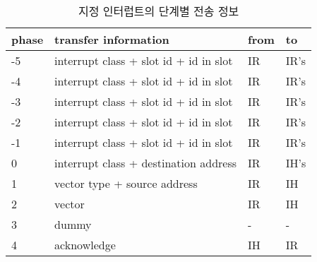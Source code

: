 %
%
\begin{table}[htbp]
\caption{지정 인터럽트의 단계별 전송 정보}\label{table:dir-int}
   \begin{center}
   \begin{tabular}{|l|l|l|l|} \hline
	phase & transfer information & from & to \\
\hline \hline
	-5 & interrupt class + slot id + id in slot & IR & IR's \\
	-4 & interrupt class + slot id + id in slot & IR & IR's \\
	-3 & interrupt class + slot id + id in slot & IR & IR's \\
	-2 & interrupt class + slot id + id in slot & IR & IR's \\
	-1 & interrupt class + slot id + id in slot & IR & IR's \\ \hline
	0  & interrupt class + destination address  & IR & IH's \\ \hline
	1  & vector type + source address           & IR & IH \\ \hline
	2  & vector                                 & IR & IH \\ \hline
	3  & dummy                                  & -  & - \\ \hline
	4  & acknowledge                            & IH & IR \\ \hline
   \end{tabular}
   \end{center}
\end{table}
%
%
